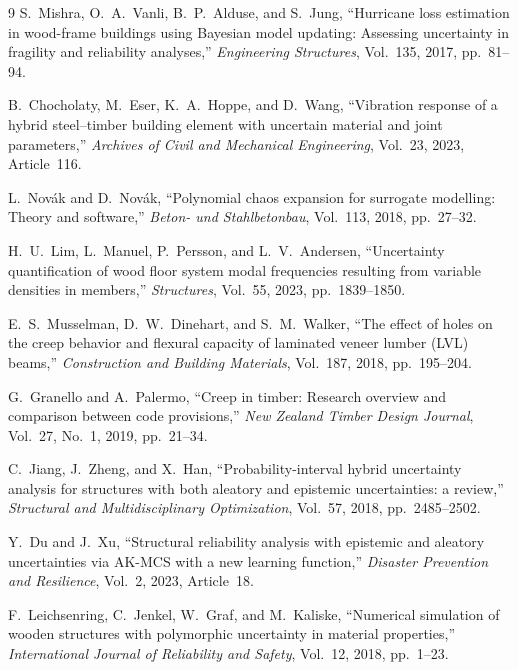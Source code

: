 \documentclass[10pt,twocolumn]{article}
\begin{document}
\begin{thebibliography}{9}
S.~Mishra, O.~A.~Vanli, B.~P.~Alduse, and S.~Jung,
``Hurricane loss estimation in wood-frame buildings using Bayesian model
  updating: Assessing uncertainty in fragility and reliability analyses,''
\textit{Engineering Structures}, Vol.~135, 2017, pp.~81--94.

B.~Chocholaty, M.~Eser, K.~A.~Hoppe, and D.~Wang,
``Vibration response of a hybrid steel--timber building element with
  uncertain material and joint parameters,''
\textit{Archives of Civil and Mechanical Engineering},
Vol.~23, 2023, Article~116.

L.~Nov\'{a}k and D.~Nov\'{a}k,
``Polynomial chaos expansion for surrogate modelling: Theory and software,''
\textit{Beton- und Stahlbetonbau}, Vol.~113, 2018, pp.~27--32.

H.~U.~Lim, L.~Manuel, P.~Persson, and L.~V.~Andersen,
``Uncertainty quantification of wood floor system modal frequencies
  resulting from variable densities in members,''
\textit{Structures}, Vol.~55, 2023, pp.~1839--1850.

E.~S.~Musselman, D.~W.~Dinehart, and S.~M.~Walker,
``The effect of holes on the creep behavior and flexural capacity of
  laminated veneer lumber (LVL) beams,''
\textit{Construction and Building Materials}, Vol.~187, 2018,
pp.~195--204.

G.~Granello and A.~Palermo,
``Creep in timber: Research overview and comparison between code
  provisions,''
\textit{New Zealand Timber Design Journal}, Vol.~27, No.~1, 2019,
pp.~21--34.

C.~Jiang, J.~Zheng, and X.~Han,
``Probability-interval hybrid uncertainty analysis for structures with
  both aleatory and epistemic uncertainties: a review,''
\textit{Structural and Multidisciplinary Optimization},
Vol.~57, 2018, pp.~2485--2502.

Y.~Du and J.~Xu,
``Structural reliability analysis with epistemic and aleatory
  uncertainties via AK-MCS with a new learning function,''
\textit{Disaster Prevention and Resilience}, Vol.~2, 2023, Article~18.

F.~Leichsenring, C.~Jenkel, W.~Graf, and M.~Kaliske,
``Numerical simulation of wooden structures with polymorphic uncertainty
  in material properties,''
\textit{International Journal of Reliability and Safety},
Vol.~12, 2018, pp.~1--23.

\end{thebibliography}
\end{document}
